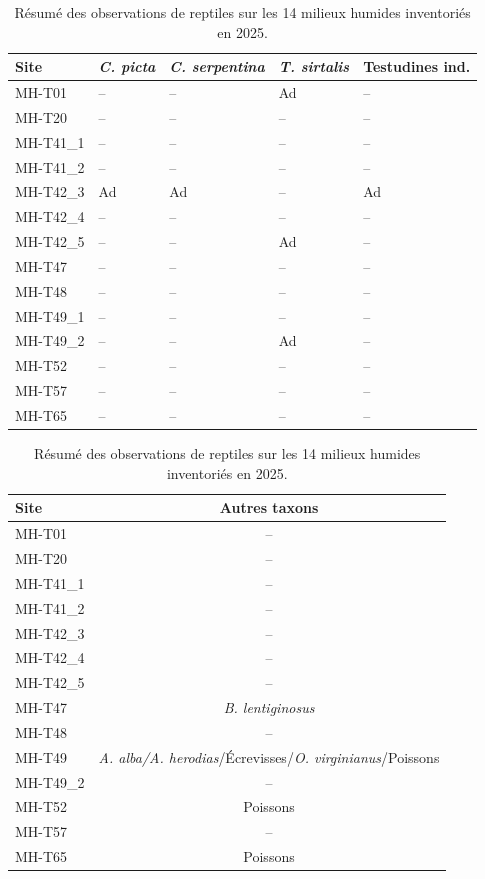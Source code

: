 \begin{table}[H]
\centering
\caption{Résumé des observations de reptiles sur les 14 milieux humides inventoriés en 2025.}
\label{tab:tab_mh_squamates}
\begin{tabular}{lllll}
  \toprule
Site & \emph{C. picta} & \emph{C. serpentina} & \emph{T. sirtalis} & Testudines ind. \\ 
  \midrule
MH-T01 & -- & -- & Ad & -- \\ 
  MH-T20 & -- & -- & -- & -- \\ 
  MH-T41\_1 & -- & -- & -- & -- \\ 
  MH-T41\_2 & -- & -- & -- & -- \\ 
  MH-T42\_3 & Ad & Ad & -- & Ad \\ 
  MH-T42\_4 & -- & -- & -- & -- \\ 
  MH-T42\_5 & -- & -- & Ad & -- \\ 
  MH-T47 & -- & -- & -- & -- \\ 
  MH-T48 & -- & -- & -- & -- \\ 
  MH-T49\_1 & -- & -- & -- & -- \\ 
  MH-T49\_2 & -- & -- & Ad & -- \\ 
  MH-T52 & -- & -- & -- & -- \\ 
  MH-T57 & -- & -- & -- & -- \\ 
  MH-T65 & -- & -- & -- & -- \\ 
   \bottomrule
\end{tabular}
\end{table}



\begin{table}[H]
\centering
\caption{Résumé des observations de reptiles sur les 14 milieux humides inventoriés en 2025.}
\label{tab:tab_mh_squamates}
\begin{tabular}{lc}
  \toprule
Site & Autres taxons \\ 
  \midrule
MH-T01 & -- \\ 
  MH-T20 & -- \\ 
  MH-T41\_1 & -- \\ 
  MH-T41\_2 & -- \\ 
  MH-T42\_3 & -- \\ 
  MH-T42\_4 & -- \\ 
  MH-T42\_5 & -- \\ 
  MH-T47 & \emph{B. lentiginosus} \\ 
  MH-T48 & -- \\ 
  MH-T49 & \emph{A. alba/A. herodias}/Écrevisses/\emph{O. virginianus}/Poissons \\ 
  MH-T49\_2 & -- \\ 
  MH-T52 & Poissons \\ 
  MH-T57 & -- \\ 
  MH-T65 & Poissons \\ 
   \bottomrule
\end{tabular}
\end{table}
